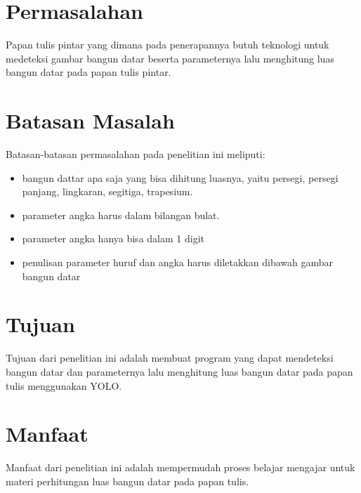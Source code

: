 \section{Permasalahan}
\label{sec:permasalahan}

Papan tulis pintar yang dimana pada penerapannya butuh teknologi untuk medeteksi gambar bangun datar beserta parameternya lalu menghitung luas bangun datar pada papan tulis pintar.

\section{Batasan Masalah}
\label{sec:batasanmasalah}

Batasan-batasan permasalahan pada penelitian ini meliputi:
\begin{itemize}
	\item  bangun dattar apa saja yang bisa dihitung luasnya, yaitu persegi, persegi panjang, lingkaran, segitiga, trapesium.
	\item parameter angka harus dalam bilangan bulat.
	\item parameter angka hanya bisa dalam 1 digit
	\item penulisan parameter huruf dan angka harus diletakkan dibawah gambar bangun datar
\end{itemize}

\section{Tujuan}
\label{sec:Tujuan}

Tujuan dari penelitian ini adalah membuat program yang dapat mendeteksi bangun datar dan parameternya lalu menghitung luas bangun datar pada papan tulis menggunakan YOLO.

\section{Manfaat}
\label{sec:manfaat}

Manfaat dari penelitian ini adalah mempermudah proses belajar mengajar untuk materi perhitungan luas bangun datar pada papan tulis.